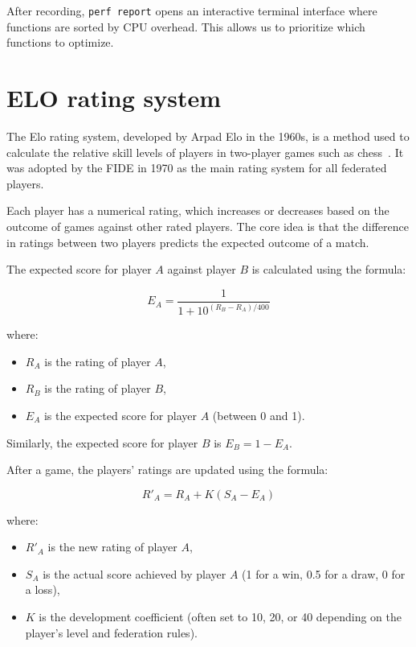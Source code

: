 \noindent After recording, \texttt{perf report} opens an interactive terminal interface where functions are sorted by CPU overhead. This allows us to prioritize which functions to optimize.

\section{ELO rating system}

The Elo rating system, developed by Arpad Elo in the 1960s, is a method used to calculate the relative skill levels of players in two-player games such as chess~\cite{Elo}. It was adopted by the FIDE in 1970 as the main rating system for all federated players.

\vspace{1em}

Each player has a numerical rating, which increases or decreases based on the outcome of games against other rated players. The core idea is that the difference in ratings between two players predicts the expected outcome of a match.

The expected score for player \( A \) against player \( B \) is calculated using the formula:

\[
E_A = \frac{1}{1 + 10^{(R_B - R_A)/400}}
\]

where:
\begin{itemize}
  \item \( R_A \) is the rating of player \( A \),
  \item \( R_B \) is the rating of player \( B \),
  \item \( E_A \) is the expected score for player \( A \) (between 0 and 1).
\end{itemize}

Similarly, the expected score for player \( B \) is \( E_B = 1 - E_A \).

After a game, the players' ratings are updated using the formula:

\[
R'_A = R_A + K (S_A - E_A)
\]

where:
\begin{itemize}
  \item \( R'_A \) is the new rating of player \( A \),
  \item \( S_A \) is the actual score achieved by player \( A \) (1 for a win, 0.5 for a draw, 0 for a loss),
  \item \( K \) is the development coefficient (often set to 10, 20, or 40 depending on the player's level and federation rules).
\end{itemize}

